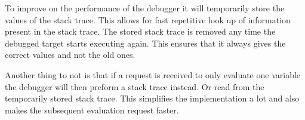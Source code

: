 To improve on the performance of the debugger it will temporarily store the values of the stack trace.
This allows for fast repetitive look up of information present in the stack trace.
The stored stack trace is removed any time the debugged target starts executing again.
This ensures that it always gives the correct values and not the old ones.


Another thing to not is that if a request is received to only evaluate one variable the debugger will then preform a stack trace instead.
Or read from the temporarily stored stack trace.
This simplifies the implementation a lot and also makes the subsequent evaluation request faster.


